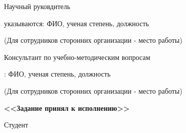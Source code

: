 \documentclass{report}
\begin{document}
\vspace{2cm}
Научный руковдитель\par
\vspace{1.5cm}
{\scriptsize указываются: ФИО, ученая степень, должность\par
(Для сотрудников сторонних организации - место работы)}\par
\vspace{1cm}
Консультант по учебно-методическим вопросам\par\nopagebreak
\vspace{1.5cm}

{: ФИО, ученая степень, должность\par
(Для сотрудников сторонних организации - место работы)}\par
\vspace{1.5cm}
\hspace{1cm}
\textbf{<<Задание принял к исполнению>>}\par
\begin{center}
Студент
\end{center}
\end{document}
